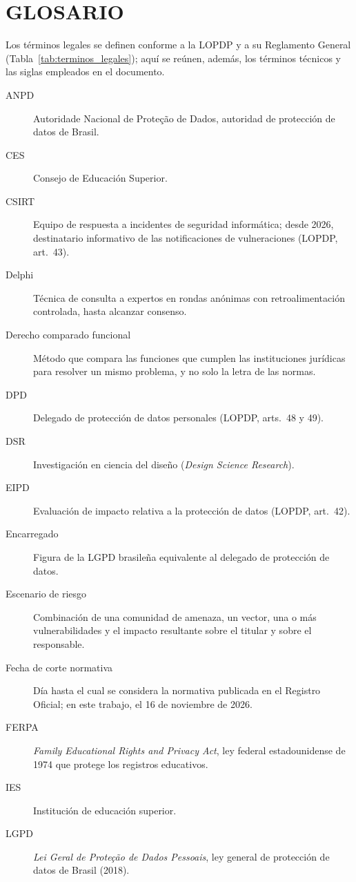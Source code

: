 \clearpage
\chapter*{GLOSARIO}

\noindent Los términos legales se definen conforme a la LOPDP y a su Reglamento General (Tabla~\ref{tab:terminos_legales}); aquí se reúnen, además, los términos técnicos y las siglas empleados en el documento.

\begin{description}
  \item[ANPD] Autoridade Nacional de Proteção de Dados, autoridad de protección de datos de Brasil.
  \item[CES] Consejo de Educación Superior.
  \item[CSIRT] Equipo de respuesta a incidentes de seguridad informática; desde 2026, destinatario informativo de las notificaciones de vulneraciones (LOPDP, art.~43).
  \item[Delphi] Técnica de consulta a expertos en rondas anónimas con retroalimentación controlada, hasta alcanzar consenso.
  \item[Derecho comparado funcional] Método que compara las funciones que cumplen las instituciones jurídicas para resolver un mismo problema, y no solo la letra de las normas.
  \item[DPD] Delegado de protección de datos personales (LOPDP, arts.~48 y 49).
  \item[DSR] Investigación en ciencia del diseño (\textit{Design Science Research}).
  \item[EIPD] Evaluación de impacto relativa a la protección de datos (LOPDP, art.~42).
  \item[Encarregado] Figura de la LGPD brasileña equivalente al delegado de protección de datos.
  \item[Escenario de riesgo] Combinación de una comunidad de amenaza, un vector, una o más vulnerabilidades y el impacto resultante sobre el titular y sobre el responsable.
  \item[Fecha de corte normativa] Día hasta el cual se considera la normativa publicada en el Registro Oficial; en este trabajo, el 16 de noviembre de 2026.
  \item[FERPA] \textit{Family Educational Rights and Privacy Act}, ley federal estadounidense de 1974 que protege los registros educativos.
  \item[IES] Institución de educación superior.
  \item[LGPD] \textit{Lei Geral de Proteção de Dados Pessoais}, ley general de protección de datos de Brasil (2018).

\end{description}
